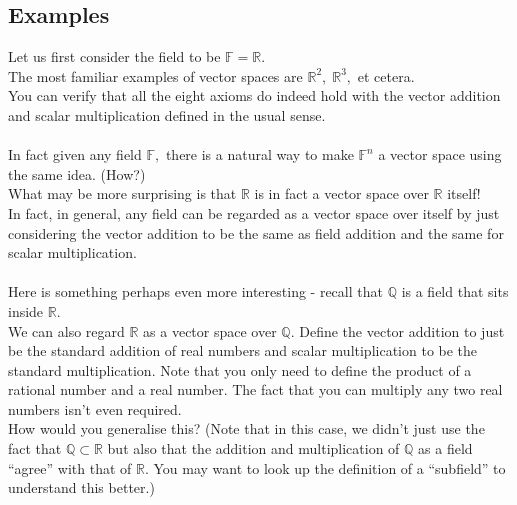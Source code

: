 \documentclass{article}
\begin{document}
\subsection{Examples}
Let us first consider the field to be $\mathbb{F} = \mathbb{R}.$\\
The most familiar examples of vector spaces are $\mathbb{R}^2,\;\mathbb{R}^3,$ et cetera.\\
You can verify that all the eight axioms do indeed hold with the vector addition and scalar multiplication defined in the usual sense.\\~\\
%
In fact given any field $\mathbb{F},$ there is a natural way to make $\mathbb{F}^n$ a vector space using the same idea. (How?)\\
What may be more surprising is that $\mathbb{R}$ is in fact a vector space over $\mathbb{R}$ itself!\\
In fact, in general, any field can be regarded as a vector space over itself by just considering the vector addition to be the same as field addition and the same for scalar multiplication.\\~\\
%
Here is something perhaps even more interesting - recall that $\mathbb{Q}$ is a field that sits inside $\mathbb{R}.$\\
We can also regard $\mathbb{R}$ as a vector space over $\mathbb{Q}.$ Define the vector addition to just be the standard addition of real numbers and scalar multiplication to be the standard multiplication. Note that you only need to define the product of a rational number and a real number. The fact that you can multiply any two real numbers isn't even required.\\
How would you generalise this? (Note that in this case, we didn't just use the fact that $\mathbb{Q} \subset \mathbb{R}$ but also that the addition and multiplication of $\mathbb{Q}$ as a field ``agree'' with that of $\mathbb{R}$. You may want to look up the definition of a ``subfield'' to understand this better.) 
\end{document}
